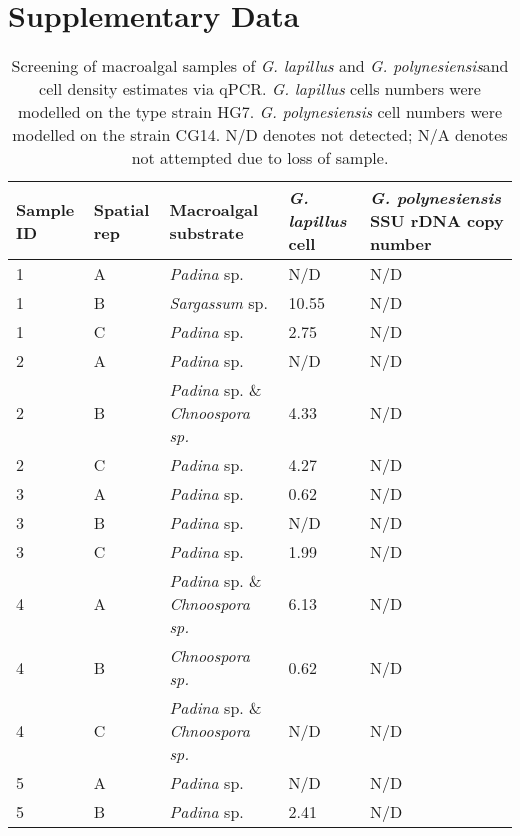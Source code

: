 \documentclass[12pt]{article}
\begin{document}


\section{Supplementary Data}
\FloatBarrier
\begin{longtable}{ | p{1cm} | p{1cm} | p{3cm} | p{4cm} | p{4cm} | }
\caption{Screening of macroalgal samples of \emph{G. lapillus} and \emph{G. polynesiensis}and cell density estimates via qPCR. \emph{G. lapillus} cells numbers were modelled on the type strain HG7. \emph{G. polynesiensis} cell numbers were modelled on the strain CG14. N/D denotes not detected; N/A denotes not attempted due to loss of sample.}\\
\hline
\label{tbl:MacroalgaeTable}
\textbf{Sample ID}&\textbf{Spatial rep}&\textbf{Macroalgal substrate}&\textbf{\textit{G. lapillus} cell}&\textbf{\textit{G. polynesiensis} SSU rDNA copy number }\\
\hline
1&A&\emph{Padina} sp.&N/D&N/D\\
\hline
1&B&\emph{Sargassum} sp.&10.55
&N/D\\
\hline
1&C&\emph{Padina} sp.&2.75
&N/D\\
\hline
2&A&\emph{Padina} sp.&N/D&N/D\\
\hline
2&B&\emph{Padina} sp. \& \emph{Chnoospora sp.}&4.33
&N/D\\
\hline
2&C&\emph{Padina} sp.&4.27
&N/D\\
\hline
3&A&\emph{Padina} sp.&0.62
&N/D\\
\hline
3&B&\emph{Padina} sp.&N/D&N/D\\
\hline
3&C&\emph{Padina} sp.&1.99
&N/D\\
\hline
4&A&\emph{Padina} sp. \& \emph{Chnoospora sp.}&6.13
&N/D\\
\hline
4&B&\emph{Chnoospora sp.}&0.62
&N/D\\
\hline
4&C&\emph{Padina} sp. \& \emph{Chnoospora sp.}&N/D&N/D\\
\hline
5&A&\emph{Padina} sp.&N/D&N/D\\
\hline
5&B&\emph{Padina} sp.&2.41
&N/D\\

\end{longtable}
\end{document}
